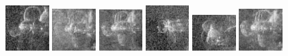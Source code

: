 \begin{figure}
    \includegraphics[width=0.15\textwidth]{chapters/images/dataset/all-class-images/propeler/propeler-69.jpg}
    \includegraphics[width=0.15\textwidth]{chapters/images/dataset/all-class-images/propeler/propeler-20.jpg}
    \includegraphics[width=0.15\textwidth]{chapters/images/dataset/all-class-images/propeler/propeler-89.jpg}
    \includegraphics[width=0.15\textwidth]{chapters/images/dataset/all-class-images/propeler/propeler-12.jpg}
    \includegraphics[width=0.15\textwidth]{chapters/images/dataset/all-class-images/propeler/propeler-121.jpg}
    \includegraphics[width=0.15\textwidth]{chapters/images/dataset/all-class-images/propeler/propeler-25.jpg}
    

\end{figure}
